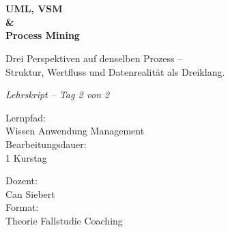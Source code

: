 \documentclass[11pt,a4paper,oneside]{article}
\newcommand{\caveatfontfallback}{\itshape}
\newcommand\caveatfont{\caveatfontfallback}%
\begin{document}
\begin{titlepage}
  \pagestyle{empty}
  \vspace*{1.5cm}
  \\[2pt]
  \noindent{\color{lpAccent}\rule{\linewidth}{1.2pt}}\\[4pt]

  \vspace{3cm}
  {\sffamily\fontsize{30}{34}\selectfont\bfseries\color{lpInk}UML, VSM\\\&\\Process Mining\par}

  \vspace{0.7cm}
  {\sffamily\large\color{lpGray}Drei Perspektiven auf denselben Prozess --\\Struktur, Wertfluss und Datenrealität als Dreiklang.\par}

  \vspace{1.5cm}
  {\caveatfont\LARGE\color{lpAmber}Lehrskript -- Tag 2 von 2}\par

  \vfill

  \noindent\begin{minipage}{0.55\linewidth}
    {\sffamily\footnotesize\color{lpGray}Lernpfad:}\\
    {\sffamily\small\color{lpInk}Wissen \textrightarrow{} Anwendung \textrightarrow{} Management}\\[10pt]
    {\sffamily\footnotesize\color{lpGray}Bearbeitungsdauer:}\\
    {\sffamily\small\color{lpInk}1 Kurstag}
  \end{minipage}\hfill
  \begin{minipage}{0.4\linewidth}
    \raggedleft
    {\sffamily\footnotesize\color{lpGray}Dozent:}\\
    {\sffamily\small\color{lpInk}Can Siebert}\\[10pt]
    {\sffamily\footnotesize\color{lpGray}Format:}\\
    {\sffamily\small\color{lpInk}Theorie \textperiodcentered{} Fallstudie \textperiodcentered{} Coaching}
  \end{minipage}

  \vspace{0.5cm}
  \noindent{\color{lpAccent}\rule{\linewidth}{0.6pt}}
\end{titlepage}
\end{document}

